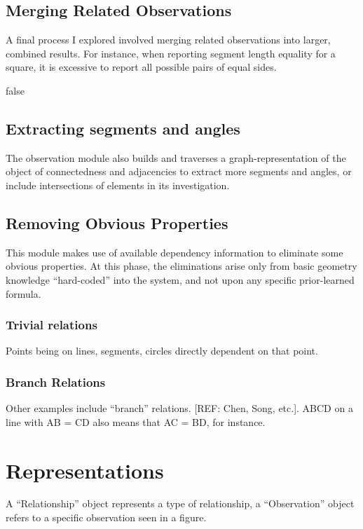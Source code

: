 \subsection{Merging Related Observations}

A final process I explored involved merging related observations into
larger, combined results. For instance, when reporting segment length
equality for a square, it is excessive to report all possible pairs of
equal sides.


\if false

\subsection{Extracting segments and angles}

The observation module also builds and traverses a
graph-representation of the object of connectedness and adjacencies to
extract more segments and angles, or include intersections of elements
in its investigation.

\subsection{Removing Obvious Properties}

This module makes use of available dependency information to eliminate
some obvious properties. At this phase, the eliminations arise only
from basic geometry knowledge ``hard-coded'' into the system, and not
upon any specific prior-learned formula.

\subsubsection{Trivial relations}

Points being on lines, segments, circles directly dependent on that point.

\subsubsection{Branch Relations}

Other examples include ``branch'' relations. [REF: Chen, Song,
  etc.]. ABCD on a line with AB = CD also means that AC = BD, for instance.

\section{Representations}

A ``Relationship'' object represents a type of relationship, a
``Observation'' object refers to a specific observation seen in a
figure.

\fi
